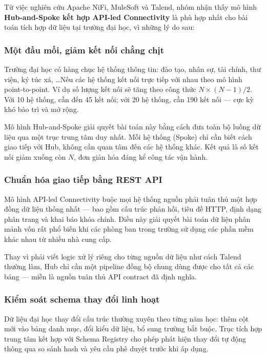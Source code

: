 Từ việc nghiên cứu Apache NiFi, MuleSoft và Talend, nhóm nhận thấy mô hình \textbf{Hub-and-Spoke kết hợp API-led Connectivity} là phù hợp nhất cho bài toán tích hợp dữ liệu tại trường đại học, vì những lý do sau:

\subsubsection{Một đầu mối, giảm kết nối chằng chịt}

Trường đại học có hàng chục hệ thống thông tin: đào tạo, nhân sự, tài chính, thư viện, ký túc xá, \ldots Nếu các hệ thống kết nối trực tiếp với nhau theo mô hình point-to-point. Ví dụ số lượng kết nối sẽ tăng theo công thức $N \times (N-1)/2$. Với 10 hệ thống, cần đến 45 kết nối; với 20 hệ thống, cần 190 kết nối — cực kỳ khó bảo trì và mở rộng.

Mô hình Hub-and-Spoke giải quyết bài toán này bằng cách đưa toàn bộ luồng dữ liệu qua một trục trung tâm duy nhất. Mỗi hệ thống (Spoke) chỉ cần biết cách giao tiếp với Hub, không cần quan tâm đến các hệ thống khác. Kết quả là số kết nối giảm xuống còn $N$, đơn giản hóa đáng kể công tác vận hành.

\subsubsection{Chuẩn hóa giao tiếp bằng REST API}

Mô hình API-led Connectivity buộc mọi hệ thống nguồn phải tuân thủ một hợp đồng dữ liệu thống nhất — bao gồm cấu trúc phản hồi, tiêu đề HTTP, định dạng phân trang và khai báo khóa chính. Điều này giải quyết bài toán dữ liệu phân mảnh vốn rất phổ biến khi các phòng ban trong trường sử dụng các phần mềm khác nhau từ nhiều nhà cung cấp.

Thay vì phải viết logic xử lý riêng cho từng nguồn dữ liệu như cách Talend thường làm, Hub chỉ cần một pipeline đồng bộ chung dùng được cho tất cả các bảng — miễn là nguồn tuân thủ API contract đã định nghĩa.

\subsubsection{Kiểm soát schema thay đổi linh hoạt}

Dữ liệu đại học thay đổi cấu trúc thường xuyên theo từng năm học: thêm cột mới vào bảng danh mục, đổi kiểu dữ liệu, bổ sung trường bắt buộc. Trục tích hợp trung tâm kết hợp với Schema Registry cho phép phát hiện thay đổi tự động thông qua so sánh hash và yêu cầu phê duyệt trước khi áp dụng.

